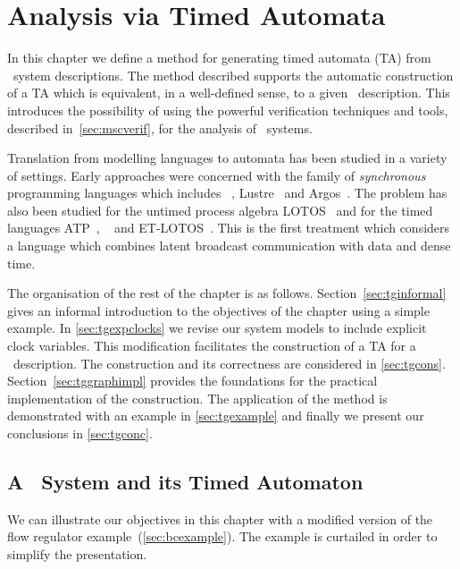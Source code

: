 \chapter{Analysis via Timed Automata}\label{chap:tggen}
In this chapter we define a method for generating
timed automata (TA) from \bcandle\ system descriptions. The method
described supports the automatic construction of a TA
which is equivalent, in a well-defined sense, to a given
\bcandle\ description. This introduces the possibility of 
using the powerful verification techniques and tools, described
in~\Sec\ref{sec:mscverif}, for the analysis of \bcandle\ systems.

Translation from modelling languages to automata has been studied in a
variety of settings. Early approaches were concerned with the family
of \emph{synchronous} programming languages which includes
\esterel~\cite{bg:92}, Lustre~\cite{hlr:92} and Argos~\cite{jm:95}.
The problem has also been studied for the untimed process algebra
LOTOS~\cite{gar:92} and for the timed languages
ATP~\cite{nic:92,nsy:92,yov:93}, \aorta~\cite{bhkr:95b} and
ET-LOTOS~\cite{her:98}. This is the first treatment which considers a
language which combines latent broadcast communication with data and 
dense time.
 
The organisation of the rest of the chapter is as follows. 
Section~\ref{sec:tginformal} gives an informal introduction to
the objectives of the chapter using a simple example. In
\Sec\ref{sec:tgexpclocks} we revise our system models to include
explicit clock variables. This modification facilitates the
construction of a TA for a \bcandle\ description. The
construction and its correctness are considered in
\Sec\ref{sec:tgcons}. Section~\ref{sec:tggraphimpl} provides the foundations
for the practical implementation of the construction.  The application
of the method is demonstrated with an example in
\Sec\ref{sec:tgexample} and finally we present our
conclusions in \Sec\ref{sec:tgconc}.

\section{A \bcandle\ System and its Timed Automaton\label{sec:tginformal}}
We can illustrate our objectives in this chapter with a modified version
of the flow regulator example~(\Sec\ref{sec:bcexample}).
The example is curtailed in order to simplify the presentation.  

